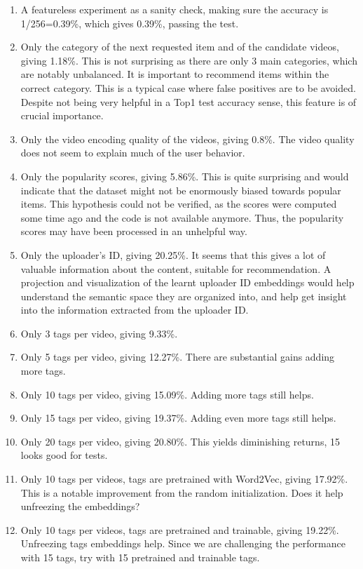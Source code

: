 \begin{enumerate}
    \item A featureless experiment as a sanity check, making sure the accuracy is 1/256=0.39\%, which gives 0.39\%, passing the test.
    \item Only the category of the next requested item and of the candidate videos, giving 1.18\%. This is not surprising as there are only 3 main categories, which are notably unbalanced. It is important to recommend items within the correct category. This is a typical case where false positives are to be avoided. Despite not being very helpful in a Top1 test accuracy sense, this feature is of crucial importance.
    \item Only the video encoding quality of the videos, giving 0.8\%. The video quality does not seem to explain much of the user behavior.
    \item Only the popularity scores, giving 5.86\%. This is quite surprising and would indicate that the dataset might not be enormously biased towards popular items. This hypothesis could not be verified, as the scores were computed some time ago and the code is not available anymore. Thus, the popularity scores may have been processed in an unhelpful way. 
    \item Only the uploader's ID, giving 20.25\%. It seems that this gives a lot of valuable information about the content, suitable for recommendation. A projection and visualization of the learnt uploader ID embeddings would help understand the semantic space they are organized into, and help get insight into the information extracted from the uploader ID.
    \item Only 3 tags per video, giving 9.33\%.
    \item Only 5 tags per video, giving 12.27\%. There are substantial gains adding more tags.
    \item Only 10 tags per video, giving 15.09\%. Adding more tags still helps.
    \item Only 15 tags per video, giving 19.37\%. Adding even more tags still helps.
    \item Only 20 tags per video, giving 20.80\%. This yields diminishing returns, 15 looks good for tests.
    \item Only 10 tags per videos, tags are pretrained with Word2Vec, giving 17.92\%. This is a notable improvement from the random initialization. Does it help unfreezing the embeddings?
    \item Only 10 tags per videos, tags are pretrained and trainable, giving 19.22\%. Unfreezing tags embeddings help. Since we are challenging the performance with 15 tags, try with 15 pretrained and trainable tags.

\end{enumerate}
